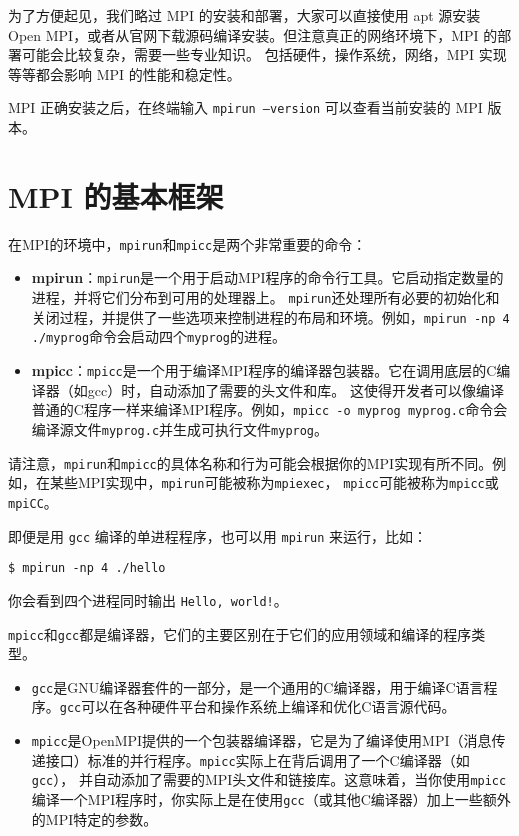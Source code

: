 \documentclass{ctexart}
\begin{document}
为了方便起见，我们略过 MPI 的安装和部署，大家可以直接使用 apt 源安装 Open MPI，或者从官网下载源码编译安装。但注意真正的网络环境下，MPI 的部署可能会比较复杂，需要一些专业知识。
包括硬件，操作系统，网络，MPI 实现等等都会影响 MPI 的性能和稳定性。

MPI 正确安装之后，在终端输入 \texttt{mpirun --version} 可以查看当前安装的 MPI 版本。

\section{MPI 的基本框架}

在MPI的环境中，\verb|mpirun|和\verb|mpicc|是两个非常重要的命令：  
  
\begin{itemize}  
    \item \textbf{mpirun}：\verb|mpirun|是一个用于启动MPI程序的命令行工具。它启动指定数量的进程，并将它们分布到可用的处理器上。
    \verb|mpirun|还处理所有必要的初始化和关闭过程，并提供了一些选项来控制进程的布局和环境。例如，\verb|mpirun -np 4 ./myprog|命令会启动四个\verb|myprog|的进程。  
  
    \item \textbf{mpicc}：\verb|mpicc|是一个用于编译MPI程序的编译器包装器。它在调用底层的C编译器（如gcc）时，自动添加了需要的头文件和库。
    这使得开发者可以像编译普通的C程序一样来编译MPI程序。例如，\verb|mpicc -o myprog myprog.c|命令会编译源文件\verb|myprog.c|并生成可执行文件\verb|myprog|。  
\end{itemize}  
  
请注意，\verb|mpirun|和\verb|mpicc|的具体名称和行为可能会根据你的MPI实现有所不同。例如，在某些MPI实现中，\verb|mpirun|可能被称为\verb|mpiexec|，
\verb|mpicc|可能被称为\verb|mpicc|或\verb|mpiCC|。  

即便是用 \verb|gcc| 编译的单进程程序，也可以用 \verb|mpirun| 来运行，比如：
\begin{verbatim}
$ mpirun -np 4 ./hello
\end{verbatim}
你会看到四个进程同时输出 \verb|Hello, world!|。

\verb|mpicc|和\verb|gcc|都是编译器，它们的主要区别在于它们的应用领域和编译的程序类型。  
  
\begin{itemize}  
    \item \verb|gcc|是GNU编译器套件的一部分，是一个通用的C编译器，用于编译C语言程序。\verb|gcc|可以在各种硬件平台和操作系统上编译和优化C语言源代码。  
  
    \item \verb|mpicc|是OpenMPI提供的一个包装器编译器，它是为了编译使用MPI（消息传递接口）标准的并行程序。\verb|mpicc|实际上在背后调用了一个C编译器（如\verb|gcc|），
    并自动添加了需要的MPI头文件和链接库。这意味着，当你使用\verb|mpicc|编译一个MPI程序时，你实际上是在使用\verb|gcc|（或其他C编译器）加上一些额外的MPI特定的参数。  
\end{itemize}  
  
\end{document}
